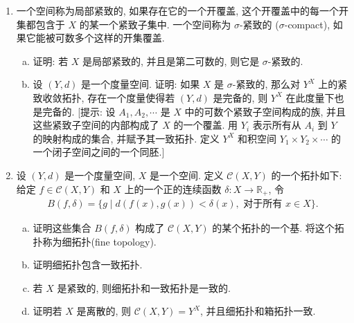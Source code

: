 \documentclass[../../main.tex]{subfiles}
\begin{document}
\begin{enumerate}
\begin{quote}
\textbf{定理.} 如果 $p\colon A\to B$ 是一个商映射, 并且 $X$ 是局部紧致的 Hausdorff 空间, 那么 $i_X\times p\colon X\times A\to X\times B$ 是一个商映射.
\end{quote}
证明:
\begin{enumerate}[(a)]
\item 设 $Y$ 是由 $i_X\times p$ 诱导的商空间, $q\colon X\times A\to Y$ 是一个商映射. 证明存在一个连续的一一映射 $f\colon Y\to X\times B$, 使得 $f\circ q=i_X\times p$.
\item 设 $g=f^{-1}$, $G\colon B\to\mathcal{C}(X,Y)$ 和 $Q\colon A\to\mathcal{C}(X,Y)$ 分别是由 $g$ 和 $q$ 诱导的映射. 证明 $Q=G\circ p$.
\item 证明 $Q$ 是连续的. 推证 $G$ 是连续的, 因此 $g$ 是连续的.
\end{enumerate}
\item 一个空间称为局部紧致的, 如果存在它的一个开覆盖, 这个开覆盖中的每一个开集都包含于 $X$ 的某一个紧致子集中. 一个空间称为 $\sigma$-紧致的 ($\sigma$-compact), 如果它能被可数多个这样的开集覆盖.
\begin{enumerate}[(a)]
\item 证明: 若 $X$ 是局部紧致的, 并且是第二可数的, 则它是 $\sigma$-紧致的.
\item 设 $(Y,d)$ 是一个度量空间. 证明: 如果 $X$ 是 $\sigma$-紧致的, 那么对 $Y^X$ 上的紧致收敛拓扑, 存在一个度量使得若 $(Y,d)$ 是完备的, 则 $Y^X$ 在此度量下也是完备的. [提示: 设 $A_1,A_2,\cdots$ 是 $X$ 中的可数个紧致子空间构成的族, 并且这些紧致子空间的内部构成了 $X$ 的一个覆盖. 用 $Y_i$ 表示所有从 $A_i$ 到 $Y$ 的映射构成的集合, 并赋予其一致拓扑. 定义 $Y^X$ 和积空间 $Y_1\times Y_2\times\cdots$ 的一个闭子空间之间的一个同胚.]
\end{enumerate}
\item 设 $(Y,d)$ 是一个度量空间, $X$ 是一个空间. 定义 $\mathcal{C}(X,Y)$ 的一个拓扑如下: 给定 $f\in\mathcal{C}(X,Y)$ 和 $X$ 上的一个正的连续函数 $\delta\colon X\to\mathbb{R}_+$, 令
\begin{align*}
B(f,\delta)=\{g\mid d(f(x),g(x))<\delta(x),\text{ 对于所有 }x\in X\}.
\end{align*}
\begin{enumerate}[(a)]
\item 证明这些集合 $B(f,\delta)$ 构成了 $\mathcal{C}(X,Y)$ 的某个拓扑的一个基. 将这个拓扑称为细拓扑(fine topology).
\item 证明细拓扑包含一致拓扑.
\item 若 $X$ 是紧致的, 则细拓扑和一致拓扑是一致的.
\item 证明若 $X$ 是离散的, 则 $\mathcal{C}(X,Y)=Y^X$, 并且细拓扑和箱拓扑一致.
\end{enumerate}
\end{enumerate}
\end{document}
